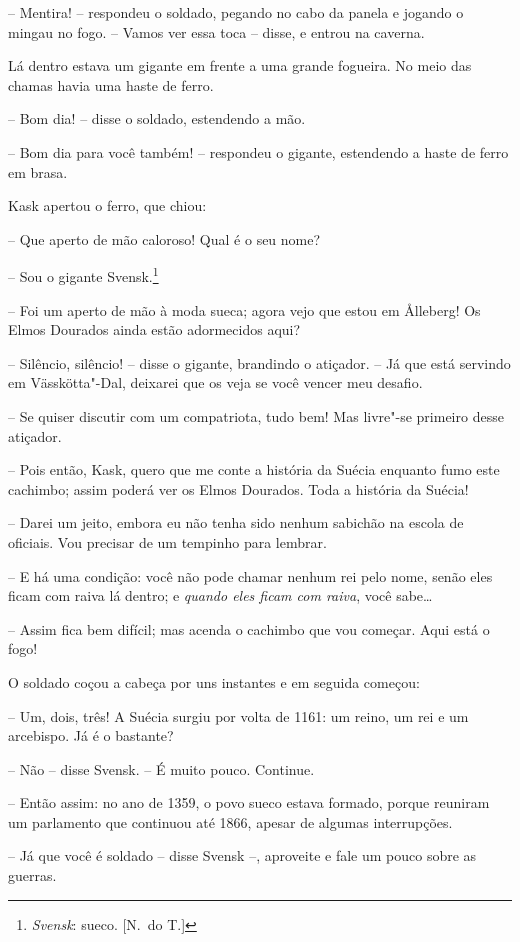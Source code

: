 -- Mentira! -- respondeu o soldado, pegando no cabo da panela e jogando o
mingau no fogo. -- Vamos ver essa toca -- disse, e entrou na caverna.

Lá dentro estava um gigante em frente a uma grande fogueira. No meio das
chamas havia uma haste de ferro.

-- Bom dia! -- disse o soldado, estendendo a mão.

-- Bom dia para você também! -- respondeu o gigante, estendendo a haste de
ferro em brasa.

Kask apertou o ferro, que chiou:

-- Que aperto de mão caloroso! Qual é o seu nome?

-- Sou o gigante Svensk.\footnote{ \textit{Svensk}: sueco. [N.~do T.]} 

-- Foi um aperto de mão à moda sueca; agora vejo que estou em \r Alleberg!
Os Elmos Dourados ainda estão adormecidos aqui?

-- Silêncio, silêncio! -- disse o gigante, brandindo o atiçador. -- Já que
está servindo em Vässkötta"-Dal, deixarei que os veja se você vencer
meu desafio.

-- Se quiser discutir com um compatriota, tudo bem! Mas livre"-se
primeiro desse atiçador.

-- Pois então, Kask, quero que me conte a história da Suécia enquanto
fumo este cachimbo; assim poderá ver os Elmos Dourados. Toda a história
da Suécia!

-- Darei  um jeito, embora eu não tenha sido nenhum sabichão na escola de
oficiais. Vou precisar de um tempinho para lembrar.

-- E há uma condição: você não pode chamar nenhum rei pelo nome, senão
eles ficam com raiva lá dentro; e \textit{quando eles ficam com raiva},
você sabe\ldots{}

-- Assim fica bem difícil; mas acenda o cachimbo que vou começar. Aqui
está o fogo!

O soldado coçou a cabeça por uns instantes e em seguida começou:

-- Um, dois, três! A Suécia surgiu por volta de 1161: um reino, um rei e
um arcebispo. Já é o bastante?

-- Não -- disse Svensk. -- É muito pouco. Continue.

-- Então assim: no ano de 1359, o povo sueco estava formado, porque
reuniram um parlamento que continuou até 1866, apesar de algumas
interrupções.

-- Já que você é soldado -- disse Svensk --, aproveite e fale um pouco
sobre as guerras.

